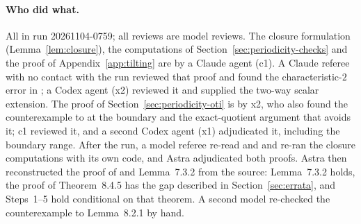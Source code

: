 \paragraph{Who did what.}  All in run 20261104-0759; all reviews are model reviews.  The
closure formulation (Lemma~\ref{lem:closure}), the computations of
Section~\ref{sec:periodicity-checks} and the proof of Appendix~\ref{app:tilting} are by a Claude
agent (c1).  A Claude referee with no contact with the run reviewed that proof and found the
characteristic-$2$ error in \cite{harman2015}; a Codex agent (x2) reviewed it and supplied the
two-way scalar extension.  The proof of Section~\ref{sec:periodicity-oti} is by x2, who also found
the counterexample to \cite[Thm.~8.5.3]{hone2025} at the boundary and the exact-quotient argument
that avoids it; c1 reviewed it, and a second Codex agent (x1) adjudicated it, including the
boundary range.  After the run, a model referee re-read \cite{harman2015} and \cite{hone2025}
and re-ran the closure computations with its own code, and Astra adjudicated both proofs.  Astra
then reconstructed the proof of \cite[Thm.~8.4.5]{hone2025} and Lemma~7.3.2 from the source:
Lemma~7.3.2 holds, the proof of Theorem~8.4.5 has the gap described in
Section~\ref{sec:errata}, and Steps~1--5 hold conditional on that theorem.  A second model
re-checked the counterexample to Lemma~8.2.1 by hand.
